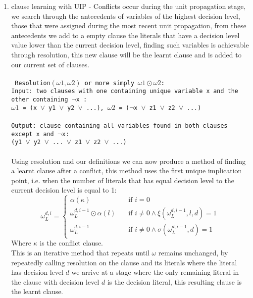 \documentclass[12pt,a4paper]{article}
\begin{document}
\begin{enumerate}
\item{clause learning with UIP \cite{GRASP} - Conflicts occur during the unit propagation stage, we search through the antecedents of variables of the highest decision level, those that were assigned during the most recent unit propagation, from these antecedents we add to a empty clause the literals that have a decision level value lower than the current decision level, finding such variables is achievable through resolution, this new clause will be the learnt clause and is added to our current set of clauses.\\\\
\texttt{
Resolution$(\omega1, \omega2)$ or more simply $\omega1\odot\omega2$: \\
Input: two clauses with one containing unique variable x and the other containing $\neg$x :\\ \hspace*{1cm} $\omega1$ = (x $\lor$ y1  $\lor$ y2 $\lor$ ...), $\omega2$ = ($\neg$x $\lor$ z1 $\lor$ z2 $\lor$ ...)\\\\
Output: clause containing all variables found in both clauses except x and $\neg$x:\\ \hspace*{2.5cm} (y1  $\lor$ y2 $\lor$ ... $\lor$ z1 $\lor$ z2 $\lor$ ...)
}\\\\
Using resolution and our definitions we can now produce a method of finding a learnt clause after a conflict, this method uses the first unique implication point, i.e. when the number of literals that has equal decision level to the current decision level is equal to 1:\\
\[ \omega_L ^{d, i} = 
  \begin{cases}
    \alpha(\kappa) & \quad \text{if } i = 0\\
    \omega_L ^{d, i-1} \odot \alpha(l) & \quad \text{if } i \neq 0 \land \xi(\omega_L ^{d, i-1}, l, d) = 1\\
     \omega_L ^{d, i-1} & \quad \text{if } i \neq 0 \land \sigma(\omega_L ^{d, i-1}, d) = 1
  \end{cases}
\]
Where $\kappa$ is the conflict clause.\\
This is an iterative method that repeats until $\omega$ remains unchanged, by repeatedly calling resolution on the clause and its literals where the literal has decision level  $d$ we arrive at a stage where the only remaining literal in the clause with decision level $d$ is the decision literal, this resulting clause is the learnt clause.
}
\end{enumerate}
\end{document}
